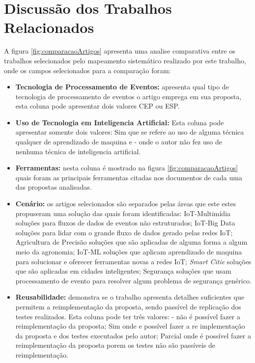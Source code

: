 \documentclass[tid,table]{texufpel} %
\begin{document}
\section{Discussão dos Trabalhos Relacionados}
 A figura \ref{fig:comparacaoArtigos} apresenta uma analise comparativa entre os trabalhos selecionados pelo mapeamento sistemático realizado por este trabalho, onde os campos selecionados para a comparação foram: 
 
\begin{itemize}
	
	\item \textbf{Tecnologia de Processamento de Eventos:}
	apresenta qual tipo de tecnologia de processamento de eventos o artigo emprega em sua proposta, esta coluna pode apresentar dois valores CEP ou ESP. 
		
	
	\item \textbf{Uso de Tecnologia em Inteligencia Artificial:} Esta coluna pode apresentar somente dois valores: Sim que se refere ao uso de alguma técnica qualquer de aprendizado de maquina e - onde o autor não fez uso de nenhuma técnica de inteligencia artificial. 
	
	\item \textbf{Ferramentas:} nesta coluna é mostrado na figura \ref{fig:comparacaoArtigos} quais foram as principais ferramentas citadas nos documentos de cada uma das propostas analisadas.
	
    \item \textbf{Cenário:} os artigos selecionados são separados pelas áreas que este estes propuseram uma solução das quais foram identificadas: IoT-Multimídia soluções para fluxos de dados de eventos não estruturados; IoT-Big Data soluções para lidar com o grande fluxo de dados gerado pelas redes IoT; Agricultura de Precisão soluções que são aplicadas de alguma forma a algum meio da agronomia; IoT-ML soluções que aplicam aprendizado de maquina para solucionar e oferecer ferramentas novas a redes IoT; \textit{Smart Citie} soluções que são aplicadas em cidades inteligentes; Segurança soluções que usam processamento de evento para resolver algum problema de segurança genérico. 
    
     \item \textbf{Reusabilidade:} demonstra se o trabalho apresenta detalhes suficientes que
      permitem a reimplementação da proposta, sendo passível de replicação dos testes realizados. Esta coluna pode ter três valores: - não é possível fazer a reimplementação da proposta; Sim onde e possível fazer a re implementação da proposta e dos testes executados pelo autor; Parcial onde é possível fazer a reimplementação da proposta porem os testes não são passíveis de reimplementação.
  
\end{itemize}
\end{document}
